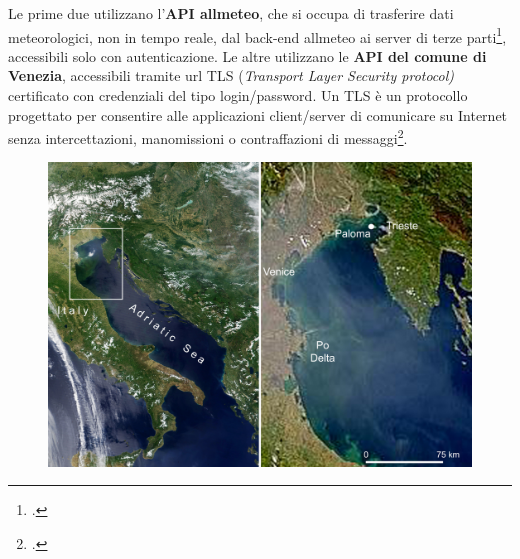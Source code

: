 \documentclass[./main.tex]{subfiles}
\begin{document}
Le prime due utilizzano l'\textbf{API allmeteo}, che si occupa di trasferire dati meteorologici, non in tempo reale, dal back-end allmeteo ai server di terze parti\footcite[\url{https://documenter.getpostman.com/view/11878734/TVYAf1Fn}]{website-api-allmeteo}, accessibili solo con autenticazione. Le altre utilizzano le \textbf{API del comune di Venezia}, accessibili tramite url TLS (\textit{Transport Layer Security protocol)} certificato con credenziali del tipo login/password. Un TLS è un protocollo progettato per consentire alle applicazioni client/server di comunicare su Internet senza intercettazioni, manomissioni o contraffazioni di messaggi\footcite[\url{https://foldoc.org/Transport_Layer_Security_protocol}]{website-TLS-def}. \par

\begin{figure}[!ht]
\noindent\begin{minipage}{0.5\textwidth}
\vspace{1cm}
\includegraphics[width=\textwidth]{images/ifon_mappa_paloma.pdf}
\captionsetup{font=small, hypcap=false}
\label{fig:ifon_mappa_paloma}
\end{minipage}
\hspace{0.05\textwidth}
\begin{minipage}{0.4\textwidth}
\vspace{1cm}

\end{minipage}
\end{figure}
\end{document}
